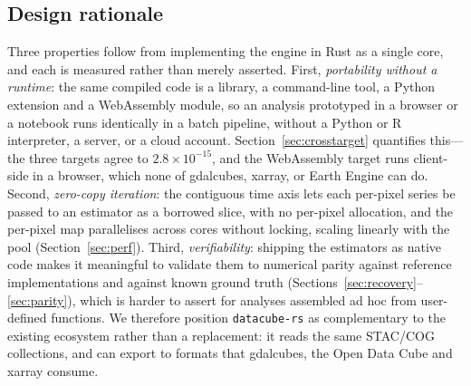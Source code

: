 \documentclass[review]{elsarticle}
\begin{document}
\subsection{Design rationale}
Three properties follow from implementing the engine in Rust as a single core,
and each is measured rather than merely asserted. First, \emph{portability
without a runtime}: the same compiled code is a library, a command-line tool, a
Python extension and a WebAssembly module, so an analysis prototyped in a
browser or a notebook runs identically in a batch pipeline, without a Python or
R interpreter, a server, or a cloud account. Section~\ref{sec:crosstarget}
quantifies this---the three targets agree to $2.8\times10^{-15}$, and the
WebAssembly target runs client-side in a browser, which none of gdalcubes,
xarray, or Earth Engine can do. Second, \emph{zero-copy iteration}: the
contiguous time axis lets each per-pixel series be passed to an estimator as a
borrowed slice, with no per-pixel allocation, and the per-pixel map parallelises
across cores without locking, scaling linearly with the pool
(Section~\ref{sec:perf}). Third, \emph{verifiability}: shipping the estimators
as native code makes it meaningful to validate them to numerical parity against
reference implementations and against known ground truth
(Sections~\ref{sec:recovery}--\ref{sec:parity}), which is harder to assert for
analyses assembled ad hoc from user-defined functions. We therefore position
\texttt{datacube-rs} as complementary to the existing ecosystem rather than a
replacement: it reads the same STAC/COG collections, and can export to formats
that gdalcubes, the Open Data Cube and xarray consume.
\end{document}
